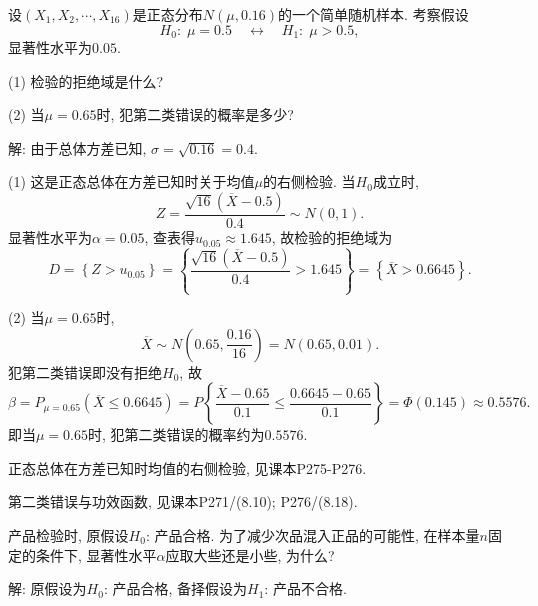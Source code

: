 \documentclass[standard]{ExBook}
\renewenvironment{shaded}{%
  \def\FrameCommand{\fboxsep=\FrameSep \colorbox{shadecolor}}%
  \MakeFramed{\advance\hsize-\width \FrameRestore}%
}{%
  \endMakeFramed
}
\begin{document}
\begin{qitems}
    \begin{bbox}
    \begin{shaded}
        \qitem
设$\left(X_1, X_2, \cdots, X_{16}\right)$是正态分布$N(\mu, 0.16)$的一个简单随机样本. 考察假设
\[
H_0: \; \mu = 0.5 \quad \longleftrightarrow \quad H_1: \; \mu > 0.5,
\]
显著性水平为$0.05$.

(1) 检验的拒绝域是什么?

(2) 当$\mu = 0.65$时, 犯第二类错误的概率是多少?
    \end{shaded}
    \end{bbox}

\vspace{\dimexpr2.5cm-5em\relax}

解: 由于总体方差已知, $\sigma=\sqrt{0.16}=0.4$.

(1) 这是正态总体在方差已知时关于均值$\mu$的右侧检验. 当$H_0$成立时,
$$
Z=\frac{\sqrt{16}(\overline{X}-0.5)}{0.4}\sim N(0,1).
$$
显著性水平为$\alpha=0.05$, 查表得$u_{0.05}\approx1.645$, 故检验的拒绝域为
$$
D
=\left\{Z>u_{0.05}\right\}
=\left\{\frac{\sqrt{16}(\overline{X}-0.5)}{0.4}>1.645\right\}
=\left\{\overline{X}>0.6645\right\}.
$$

(2) 当$\mu=0.65$时,
$$
\overline{X}\sim N\left(0.65,\frac{0.16}{16}\right)
=N(0.65,0.01).
$$
犯第二类错误即没有拒绝$H_0$, 故
$$
\beta
=P_{\mu=0.65}\left(\overline{X}\leq0.6645\right)
=P\left\{
\frac{\overline{X}-0.65}{0.1}
\leq
\frac{0.6645-0.65}{0.1}
\right\}
=\Phi(0.145)
\approx0.5576.
$$
即当$\mu=0.65$时, 犯第二类错误的概率约为$0.5576$.

\textcolor{themeColor}{\selectfont {} 正态总体在方差已知时均值的右侧检验, 见课本P275-P276.}

\textcolor{themeColor}{\selectfont {} 第二类错误与功效函数, 见课本P271/(8.10); P276/(8.18).}

\vspace{2.5cm-5em}

    \begin{bbox} 
    \begin{shaded}
        \qitem
产品检验时, 原假设$H_0$: 产品合格. 为了减少次品混入正品的可能性, 在样本量$n$固定的条件下, 显著性水平$\alpha$应取大些还是小些, 为什么?
    \end{shaded}
    \end{bbox}

\vspace{\dimexpr2.5cm-5em\relax}

解: 原假设为$H_0$: 产品合格, 备择假设为$H_1$: 产品不合格.


\end{qitems}
\end{document}
